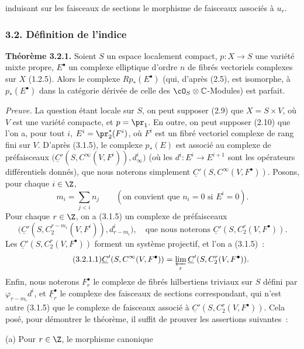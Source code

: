 induisant sur les faisceaux de sections le morphisme de faisceaux associés à $u_r$.

\subsubsection*{3.2. Définition de l'indice}
\textbf{Théorème 3.2.1.} Soient $S$ un espace localement compact, $p:X\to S$ une variété mixte propre, $E^\bullet$ un complexe elliptique d'ordre $n$ de fibrés vectoriels complexes sur $X$ (1.2.5). Alors le complexe $Rp_*(E^\bullet)$ (qui, d'après (2.5), est isomorphe, à $p_*(E^\bullet)$ dans la catégorie dérivée de celle des $\cO_S\otimes\mathbb C$-Modules) est parfait.

\emph{Preuve.} La question étant locale sur $S$, on peut supposer (2.9) que $X=S\times V$, où $V$ est une variété compacte, et $p=\pr_1$. En outre, on peut supposer (2.10) que l'on a, pour tout $i$, $E^i=\pr_2^*(F^i)$, où $F^i$ est un fibré vectoriel complexe de rang fini sur $V$. D'après (3.1.5), le complexe $p_*(E)$ est associé au complexe de préfaisceaux $\bigl(\underline C'(S,C^\infty(V,F^i)),d_\infty^i\bigr)$ (où les $d^i:E^i\longrightarrow E^{i+1}$ sont les opérateurs différentiels donnés), que nous noterons simplement $\underline C'(S,C^\infty(V,F^\bullet))$. Posons, pour chaque $i\in\Z$,
\[
  m_i=\sum_{j<i} n_j
  \qquad (\text{on convient que } n_i=0 \text{ si } E^i=0).
\]
Pour chaque $r\in\Z$, on a (3.1.5) un complexe de préfaisceaux
\[
  \bigl(\underline C'(S,C_2^{r-m_i}(V,F^i)),d_{r-m_i}^i\bigr),\quad\text{que nous noterons } \underline C'(S,C_2^r(V,F^\bullet)).
\]
Les $\underline C'(S,C_2^r(V,F^\bullet))$ forment un système projectif, et l'on a (3.1.5)~:
\begin{equation}\tag{3.2.1.1}
  \underline C'(S,C^\infty(V,F^\bullet))=\varprojlim_r \underline C'(S,C_2^r(V,F^\bullet)).
\end{equation}
Enfin, nous noterons $F_r^\bullet$ le complexe de fibrés hilbertiens triviaux sur $S$ défini par $\varphi_{r-m_i}d^i$, et $\underline F_r^\bullet$ le complexe des faisceaux de sections correspondant, qui n'est autre (3.1.5) que le complexe de faisceaux associé à $\underline C'(S,C_2^r(V,F^\bullet))$. Cela posé, pour démontrer le théorème, il suffit de prouver les assertions suivantes~:

(a) Pour $r\in\Z$, le morphisme canonique
